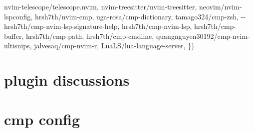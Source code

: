 \documentclass[
  letterpaper,
  DIV=11,
  numbers=noendperiod,
  oneside]{scrartcl}
\newenvironment{Shaded}{\begin{snugshade}}{\end{snugshade}}
\newcommand{\ErrorTok}[1]{\textcolor[rgb]{0.68,0.00,0.00}{#1}}
\newcommand{\ExtensionTok}[1]{\textcolor[rgb]{0.00,0.23,0.31}{#1}}
\newcommand{\KeywordTok}[1]{\textcolor[rgb]{0.00,0.23,0.31}{#1}}
\newcommand{\StringTok}[1]{\textcolor[rgb]{0.13,0.47,0.30}{#1}}
\begin{document}
\begin{Shaded}
\begin{Highlighting}[]
\StringTok{\textquotesingle{}nvim{-}telescope/telescope.nvim\textquotesingle{}}\ExtensionTok{,}
\StringTok{\textquotesingle{}nvim{-}treesitter/nvim{-}treesitter\textquotesingle{}}\ExtensionTok{,}
\StringTok{\textquotesingle{}neovim/nvim{-}lspconfig\textquotesingle{}}\ExtensionTok{,}
\StringTok{\textquotesingle{}hrsh7th/nvim{-}cmp\textquotesingle{}}\ExtensionTok{,}
\StringTok{\textquotesingle{}uga{-}rosa/cmp{-}dictionary\textquotesingle{}}\ExtensionTok{,}
\StringTok{\textquotesingle{}tamago324/cmp{-}zsh\textquotesingle{}}\ExtensionTok{,}
\ExtensionTok{{-}{-}}\StringTok{\textquotesingle{}hrsh7th/cmp{-}nvim{-}lsp{-}signature{-}help\textquotesingle{}}\ExtensionTok{,}
\StringTok{\textquotesingle{}hrsh7th/cmp{-}nvim{-}lsp\textquotesingle{}}\ExtensionTok{,}
\StringTok{\textquotesingle{}hrsh7th/cmp{-}buffer\textquotesingle{}}\ExtensionTok{,}
\StringTok{\textquotesingle{}hrsh7th/cmp{-}path\textquotesingle{}}\ExtensionTok{,}
\StringTok{\textquotesingle{}hrsh7th/cmp{-}cmdline\textquotesingle{}}\ExtensionTok{,}
\StringTok{\textquotesingle{}quangnguyen30192/cmp{-}nvim{-}ultisnips\textquotesingle{}}\ExtensionTok{,}
\StringTok{\textquotesingle{}jalvesaq/cmp{-}nvim{-}r\textquotesingle{}}\ExtensionTok{,}
\StringTok{\textquotesingle{}LuaLS/lua{-}language{-}server\textquotesingle{}}\ExtensionTok{,}
\KeywordTok{\}}\ErrorTok{)}
\end{Highlighting}
\end{Shaded}

\hypertarget{plugin-discussions}{%
\section{plugin discussions}\label{plugin-discussions}}

\hypertarget{cmp-config}{%
\section{cmp config}\label{cmp-config}}
\end{document}
